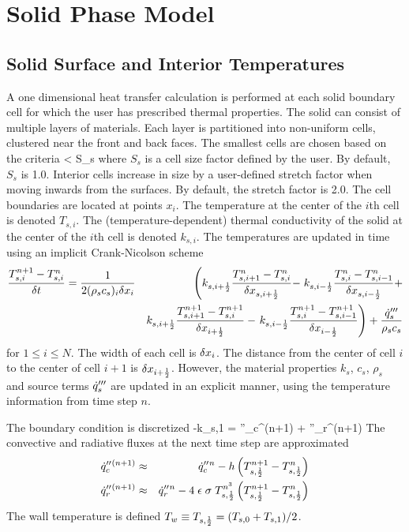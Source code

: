 \documentclass[11pt]{book}
\begin{document}
\clearpage
\section{Solid Phase Model}

\subsection{Solid Surface and Interior Temperatures}

A one dimensional heat transfer calculation is performed at each solid
boundary cell for which the user has prescribed thermal
properties. The solid can consist of multiple layers of materials.
Each layer is partitioned into non-uniform cells, clustered near the
front and back faces.  The smallest cells are chosen based on the
criteria
\be \dx < S_s \ee
where $S_s$ is a cell size factor defined by the user. By default,
$S_s$ is 1.0.  Interior cells increase in size by a user-defined
stretch factor when moving inwards from the surfaces. By default, the
stretch factor is 2.0. The cell boundaries are located at points
$x_i$. The temperature at the center of the $i$th cell is denoted $T_{s,i}$.
The (temperature-dependent) thermal conductivity of the solid
at the center of the $i$th cell is denoted $k_{s,i}$.
The temperatures are updated in time using an implicit
Crank-Nicolson scheme
\begin{eqnarray}
    \frac{T_{s,i}^{n+1}-T_{s,i}^n}{\delta t} = \frac{1}{2 (\rho_s c_s)_i \delta x_{i} }
& & \left(
    k_{s,i+\frac{1}{2}}\frac{T_{s,i+1}^n-T_{s,i}^n}{\delta x_{s,i+\frac{1}{2}}} - \right.
    k_{s,i-\frac{1}{2}}\frac{T_{s,i}^n-T_{s,i-1}^n}{\delta x_{s,i-\frac{1}{2}}} +  \nonumber \\
& & k_{s,i+\frac{1}{2}}\frac{T_{s,i+1}^{n+1}-T_{s,i}^{n+1}}{\delta x_{i+\frac{1}{2}}} -
    \left.
    k_{s,i-\frac{1}{2}}\frac{T_{s,i}^{n+1}-T_{s,i-1}^{n+1}}{\delta x_{i-\frac{1}{2}}}
     \right)
    + \frac{\dot{q}_s'''}{\rho_s c_s}
\end{eqnarray}
for $1 \le i \le N$. The width of each cell is $\delta x_i$. The distance
from the center of cell $i$ to the center of cell $i+1$ is
$\delta x_{i+\frac{1}{2}}$. However, the material properties $k_s$, $c_s$, $\rho_s$
and source terms $\dot{q}_s'''$ are updated in an explicit manner, using
the temperature information from time step $n$.

The boundary condition is discretized
\be -k_{s,1}  = \dq''_c{}^{(n+1)} + \dq''_r{}^{(n+1)} \ee
The convective and radiative fluxes at the next time step are approximated
\begin{eqnarray}
\dot{q}''_c{}^{(n+1)} &\approx& \dot{q}''_c{}^n - h\left( T_{s,\frac{1}{2}}^{n+1} - T_{s,\frac{1}{2}}^n \right) \\
\dot{q}''_r{}^{(n+1)} &\approx& \dot{q}''_r{}^n - 4 \; \epsilon \; \sigma \; T_{s,\frac{1}{2}}^{n^3} \left(
  T_{s,\frac{1}{2}}^{n+1} - T_{s,\frac{1}{2}}^n \right)  \end{eqnarray}
The wall temperature is defined $T_w \equiv T_{s,\frac{1}{2}}=(T_{s,0}+T_{s,1})/2$.
\end{document}
